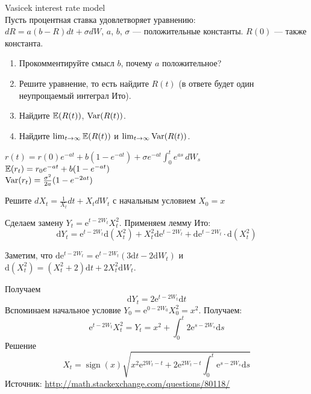 \begin{problem}
 Vasicek interest rate model \\
Пусть процентная ставка удовлетворяет уравнению: \\
$dR=a(b-R)dt+\sigma dW$, $a$, $b$, $\sigma$ — положительные константы. $R(0)$ — также константа.
\begin{enumerate}
\item Прокомментируйте смысл $b$, почему $a$ положительное?
\item Решите уравнение, то есть найдите $R(t)$ (в ответе будет один неупрощаемый интеграл Ито).
\item Найдите $\mathbb{E}(R(t))$, $\operatorname{Var}(R(t))$.
\item Найдите $\lim_{t\rightarrow\infty}\mathbb{E}(R(t))$ и $\lim_{t\rightarrow\infty}\operatorname{Var}(R(t))$.
\end{enumerate}

\begin{sol}


$ r(t) = r(0) e^{-a t} +  b \left(1- e^{-a t}\right) + \sigma e^{-a t}\int_0^t e^{a s}\,dW_s$ \\
$\mathbb{E}(r_t)=r_{0}e^{-at}+b(1-e^{-at})$ \\
$\operatorname{Var}(r_t) = \frac{\sigma^2}{2 a}(1 - e^{-2at})$
\end{sol}
\end{problem}

\begin{problem}
Решите $dX_t=\frac{1}{X_t}dt+X_tdW_t$ с начальным условием  $X_0=x$

\begin{sol}
Сделаем замену $Y_t = \mathrm{e}^{t- 2 W_t} X_t^2$. Применяем лемму Ито:
\begin{equation}
  \mathrm{d} Y_t = \mathrm{e}^{t- 2 W_t} \mathrm{d} (X_t^2) + X_t^2 \mathrm{d} \mathrm{e}^{t- 2 W_t} + \mathrm{d} \mathrm{e}^{t- 2 W_t} \cdot \mathrm{d} (X_t^2)
\end{equation}

Заметим, что $\mathrm{d} \mathrm{e}^{t- 2 W_t} = \mathrm{e}^{t- 2 W_t} \left( 3 \mathrm{d} t - 2 \mathrm{d} W_t \right)$ и $\mathrm{d}(X_t^2) = (X_t^2 + 2) \mathrm{d} t + 2 X_t^2 \mathrm{d} W_t$.

Получаем
\begin{equation}
  \mathrm{d} Y_t = 2 \mathrm{e}^{t- 2 W_t} \mathrm{d} t
\end{equation}
Вспоминаем начальное условие $Y_0 = \mathrm{e}^{0 - 2 W_0}X_0^2 = x^2$. Получаем:
\begin{equation}
   \mathrm{e}^{t- 2 W_t} X_t^2 = Y_t =  x^2 + \int_0^t 2 \mathrm{e}^{s - 2 W_s} \mathrm{d} s
\end{equation}
Решение
\begin{equation}
  X_t = \operatorname{sign}(x) \sqrt{ x^2 \mathrm{e}^{2 W_t - t} + 2 \mathrm{e}^{2 W_t - t} \int_0^t \mathrm{e}^{s - 2 W_s} \mathrm{d} s  }
\end{equation}
Источник: \url{http://math.stackexchange.com/questions/80118/}

\end{sol}
\end{problem}

